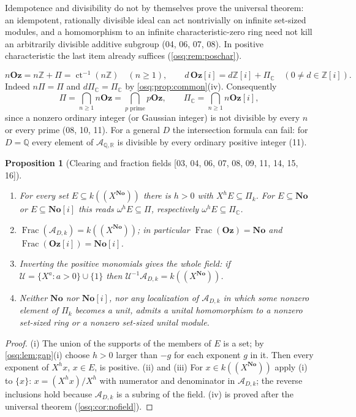 \documentclass[11pt,letterpaper]{article}
\numberwithin{equation}{section}
\newtheorem{proposition}[proposition]{Proposition}
\theoremstyle{definition}
\theoremstyle{remark}
\theoremstyle{plain}
\newcommand{\No}{\mathbf{No}}
\newcommand{\Oz}{\mathbf{Oz}}
\newcommand{\SC}{\No[i]}
\newcommand{\GOz}{\Oz[i]}
\newcommand{\Z}{\mathbb Z}
\newcommand{\Q}{\mathbb Q}
\newcommand{\R}{\mathbb R}
\newcommand{\C}{\mathbb C}
\newcommand{\A}{\mathcal A}          %
\newcommand{\hahn}[2]{#1(\!(X^{#2})\!)}
\newcommand{\ct}{\operatorname{ct}}
\newcommand{\Frac}{\operatorname{Frac}}
\newcommand{\src}[1]{\textup{\textsf{[#1]}}}
\begin{document}
Idempotence and divisibility do not by themselves prove the universal theorem: an
idempotent, rationally divisible ideal can act nontrivially on infinite set-sized
modules, and a homomorphism to an infinite characteristic-zero ring need not kill an
arbitrarily divisible additive subgroup (04, 06, 07, 08). In positive characteristic the
last item already suffices (\cref{osq:rem:poschar}).

\begin{equation}\label{osq:eq:nOz}
 n\Oz=n\Z+\Pi=\ct^{-1}(n\Z)\quad(n\ge1),\qquad
 d\,\GOz=d\Z[i]+\Pi_\C\quad(0\ne d\in\Z[i]).
\end{equation}
Indeed $n\Pi=\Pi$ and $d\Pi_\C=\Pi_\C$ by \cref{osq:prop:common}(iv). Consequently
\begin{equation}\label{osq:eq:intersection}
 \Pi=\bigcap_{n\ge1}n\Oz=\bigcap_{p\text{ prime}}p\Oz,\qquad
 \Pi_\C=\bigcap_{n\ge1}n\GOz,
\end{equation}
since a nonzero ordinary integer (or Gaussian integer) is not divisible by every $n$ or
every prime (08, 10, 11). For a general $D$ the intersection formula can fail: for $D=\Q$
every element of $\A_{\Q,\R}$ is divisible by every ordinary positive integer (11).

\begin{proposition}[Clearing and fraction fields \src{03, 04, 06, 07, 08, 09, 11, 14, 15, 16}]\label{osq:prop:fractions}
\leavevmode
\begin{enumerate}
\item For every set $E\subseteq\hahn k\No$ there is $h>0$ with $X^hE\subseteq\Pi_k$. For
$E\subseteq\No$ or $E\subseteq\SC$ this reads $\omega^hE\subseteq\Pi$, respectively
$\omega^hE\subseteq\Pi_\C$.
\item $\Frac(\A_{D,k})=\hahn k\No$; in particular $\Frac(\Oz)=\No$ and
$\Frac(\GOz)=\SC$.
\item Inverting the positive monomials gives the whole field: if
$\mathcal U=\{X^a:a>0\}\cup\{1\}$ then $\mathcal U^{-1}\A_{D,k}=\hahn k\No$.
\item Neither $\No$ nor $\SC$, nor any localization of $\A_{D,k}$ in which some nonzero
element of $\Pi_k$ becomes a unit, admits a unital homomorphism to a nonzero set-sized
ring or a nonzero set-sized unital module.
\end{enumerate}
\end{proposition}
\begin{proof}
(i) The union of the supports of the members of $E$ is a set; by \cref{osq:lem:gap}(i)
choose $h>0$ larger than $-g$ for each exponent $g$ in it. Then every exponent of $X^hx$,
$x\in E$, is positive. (ii) and (iii) For $x\in\hahn k\No$ apply (i) to $\{x\}$:
$x=(X^hx)/X^h$ with numerator and denominator in $\A_{D,k}$; the reverse inclusions hold
because $\A_{D,k}$ is a subring of the field. (iv) is proved after the universal theorem
(\cref{osq:cor:nofield}).
\end{proof}
\end{document}
